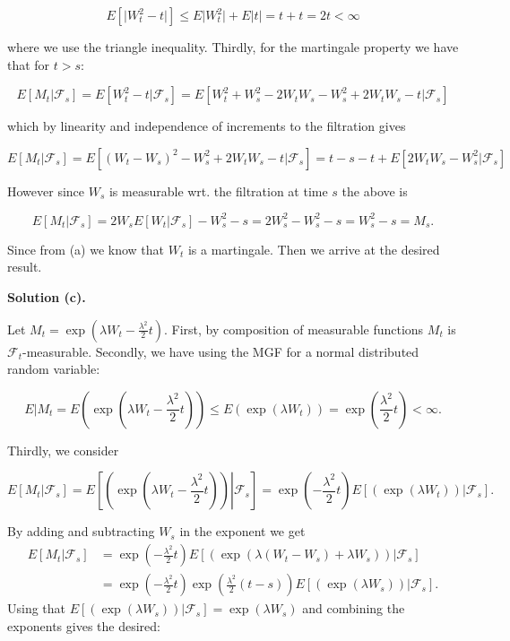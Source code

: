 \documentclass[a4paper,12pt,openany]{book}
\begin{document}
\[
E[\vert W_t^2-t\vert]\le E\vert W_t^2\vert +E\vert t\vert=t+t=2t<\infty
\]

where we use the triangle inequality. Thirdly, for the martingale property we have that for \(t>s\):

\[
E[M_t\vert \mathcal{F}_s]=E[W_t^2-t\vert \mathcal{F}_s]=E[W_t^2+W_s^2-2W_tW_s-W_s^2+2W_tW_s-t\vert \mathcal{F}_s]
\]

which by linearity and independence of increments to the filtration gives

\[
E[M_t\vert \mathcal{F}_s]=E[(W_t-W_s)^2-W_s^2+2W_tW_s-t\vert \mathcal{F}_s]=t-s-t+E[2W_tW_s-W_s^2\vert \mathcal{F}_s]
\]

However since \(W_s\) is measurable wrt. the filtration at time \(s\) the above is

\[
E[M_t\vert \mathcal{F}_s]=2W_sE[W_t\vert \mathcal{F}_s]-W_s^2-s=2W_s^2-W_s^2-s=W_s^2-s=M_s.
\]

Since from (a) we know that \(W_t\) is a martingale. Then we arrive at the desired result.

\textbf{Solution (c).}

Let \(M_t=\exp\left(\lambda W_t-\frac{\lambda^2}{2}t\right)\). First, by composition of measurable functions \(M_t\) is \(\mathcal{F}_t\)-measurable. Secondly, we have using the MGF for a normal distributed random variable:

\[
E\vert M_t=E\left(\exp\left(\lambda W_t-\frac{\lambda^2}{2}t\right)\right)\le E\left(\exp\left(\lambda W_t\right)\right)=\exp\left(\frac{\lambda^2}{2}t\right)<\infty.
\]

Thirdly, we consider

\[
E[M_t\vert\mathcal{F}_s]=E\left.\left[\left(\exp\left(\lambda W_t-\frac{\lambda^2}{2}t\right)\right)\right\vert\mathcal{F}_s\right]=\exp\left(-\frac{\lambda^2}{2}t\right)E\left.\left[\left(\exp\left(\lambda W_t\right)\right)\right\vert\mathcal{F}_s\right].
\]

By adding and subtracting \(W_s\) in the exponent we get
\begin{align*}
E[M_t\vert\mathcal{F}_s]&=\exp\left(-\frac{\lambda^2}{2}t\right)E\left.\left[\left(\exp\left(\lambda (W_t-W_s)+\lambda W_s\right)\right)\right\vert\mathcal{F}_s\right]\\
&=\exp\left(-\frac{\lambda^2}{2}t\right)\exp\left(\frac{\lambda^2}{2}(t-s)\right)E\left.\left[\left(\exp\left(\lambda W_s\right)\right)\right\vert\mathcal{F}_s\right].
\end{align*}
Using that \(E\left.\left[\left(\exp\left(\lambda W_s\right)\right)\right\vert\mathcal{F}_s\right]=\exp\left(\lambda W_s\right)\) and combining the exponents gives the desired:
\end{document}
